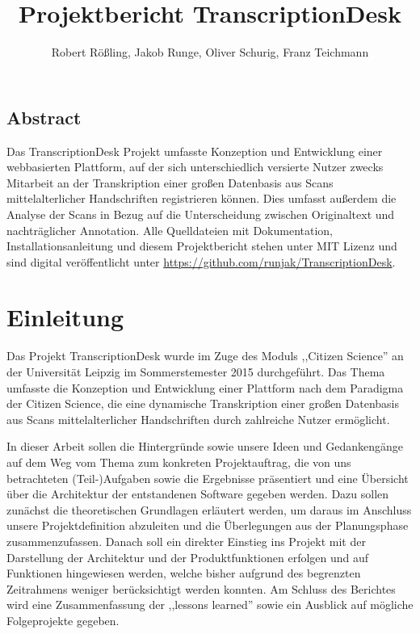 \documentclass{article}
\title{Projektbericht TranscriptionDesk}
\author{Robert Rößling, Jakob Runge, Oliver Schurig, Franz Teichmann}
\begin{document}

\maketitle

\subsection*{Abstract}
Das TranscriptionDesk Projekt umfasste Konzeption und Entwicklung einer webbasierten Plattform,
auf der sich unterschiedlich versierte Nutzer zwecks Mitarbeit an der Transkription
einer großen Datenbasis aus Scans mittelalterlicher Handschriften registrieren können.
Dies umfasst außerdem die Analyse der Scans in Bezug auf die Unterscheidung zwischen Originaltext und nachträglicher Annotation.
Alle Quelldateien mit Dokumentation, Installationsanleitung und diesem Projektbericht
stehen unter MIT Lizenz und sind digital veröffentlicht unter \url{https://github.com/runjak/TranscriptionDesk}.

\tableofcontents
\newpage

\section{Einleitung}
Das Projekt TranscriptionDesk wurde im Zuge des Moduls ,,Citizen Science'' an der Universität Leipzig im Sommerstemester 2015 durchgeführt.
Das Thema umfasste die Konzeption und Entwicklung einer Plattform nach dem Paradigma der Citizen Science,
die eine dynamische Transkription einer großen Datenbasis aus Scans mittelalterlicher Handschriften durch zahlreiche Nutzer ermöglicht.

In dieser Arbeit sollen die Hintergründe sowie unsere Ideen und Gedankengänge auf dem Weg vom Thema zum konkreten Projektauftrag,
die von uns betrachteten (Teil-)Aufgaben sowie die Ergebnisse präsentiert
und eine Übersicht über die Architektur der entstandenen Software gegeben werden.
Dazu sollen zunächst die theoretischen Grundlagen erläutert werden,
um daraus im Anschluss unsere Projektdefinition abzuleiten und die Überlegungen aus der Planungsphase zusammenzufassen.
Danach soll ein direkter Einstieg ins Projekt mit der Darstellung der Architektur und der Produktfunktionen erfolgen und auf Funktionen hingewiesen werden,
welche bisher aufgrund des begrenzten Zeitrahmens weniger berücksichtigt werden konnten.
Am Schluss des Berichtes wird eine Zusammenfassung der ,,lessons learned'' sowie ein Ausblick auf mögliche Folgeprojekte gegeben.
\end{document}
